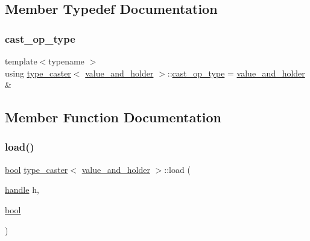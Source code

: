 \subsection{Member Typedef Documentation}
\mbox{\label{classtype__caster_3_01value__and__holder_01_4_a5c9c81f541cb624915bd7449ba03d328}} 
\subsubsection{\texorpdfstring{cast\_op\_type}{cast\_op\_type}}
{\footnotesize\ttfamily template$<$typename $>$ \\
using \mbox{\hyperlink{classtype__caster}{type\+\_\+caster}}$<$ \mbox{\hyperlink{structvalue__and__holder}{value\+\_\+and\+\_\+holder}} $>$\+::\mbox{\hyperlink{classtype__caster_3_01value__and__holder_01_4_a5c9c81f541cb624915bd7449ba03d328}{cast\+\_\+op\+\_\+type}} =  \mbox{\hyperlink{structvalue__and__holder}{value\+\_\+and\+\_\+holder}} \&}



\subsection{Member Function Documentation}
\mbox{\label{classtype__caster_3_01value__and__holder_01_4_a5b60eb7d7cd457c62e8ba6aacd4c97c2}} 
\subsubsection{\texorpdfstring{load()}{load()}}
{\footnotesize\ttfamily \mbox{\hyperlink{asdl_8h_af6a258d8f3ee5206d682d799316314b1}{bool}} \mbox{\hyperlink{classtype__caster}{type\+\_\+caster}}$<$ \mbox{\hyperlink{structvalue__and__holder}{value\+\_\+and\+\_\+holder}} $>$\+::load (\begin{DoxyParamCaption}\item[{\mbox{\hyperlink{classhandle}{handle}}}]{h,  }\item[{\mbox{\hyperlink{asdl_8h_af6a258d8f3ee5206d682d799316314b1}{bool}}}]{ }\end{DoxyParamCaption})\hspace{0.3cm}{\ttfamily [inline]}}


